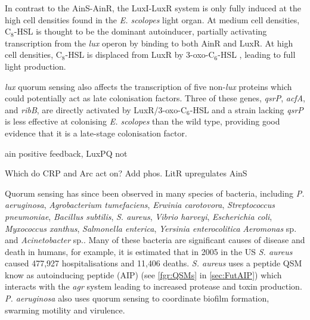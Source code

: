 In contrast to the AinS-AinR, the LuxI-LuxR system is only fully induced at the high cell densities found in the \textit{E. scolopes} light organ. At medium cell densities, C$_8$-HSL  is thought to be the dominant autoinducer, partially activating transcription from the \textit{lux} operon by binding to both AinR and LuxR\cite{Lupp2003}. At high cell densities, C$_8$-HSL  is displaced from LuxR by 3-oxo-C$_6$-HSL , leading to full light production.

\textit{lux} quorum sensing also affects the transcription of five non-\textit{lux} proteins which could potentially act as late colonisation factors\cite{Callahan2000,Qin2007}. Three of these genes, \textit{qsrP}, \textit{acfA}, and \textit{ribB}, are directly activated by LuxR/3-oxo-C$_6$-HSL\cite{Qin2007} and a strain lacking \textit{qsrP} is less effective at colonising \textit{E. scolopes} than the wild type, providing good evidence that it is a late-stage colonisation factor\cite{Callahan2000}.



ain positive feedback, LuxPQ not\cite{Lupp2004}

Which do CRP and Arc act on?
Add phos.
LitR upregulates AinS\cite{Lupp2004}





Quorum sensing has since been observed in many species of bacteria, including \textit{P. aeruginosa}, \textit{Agrobacterium tumefaciens}, \textit{Erwinia carotovora}, \textit{Streptococcus pneumoniae}, \textit{Bacillus subtilis}, \textit{S. aureus}, \textit{Vibrio harveyi}, \textit{Escherichia coli}, \textit{Myxococcus xanthus}, \textit{Salmonella enterica}, \textit{Yersinia enterocolitica}  \textit{Aeromonas} sp. and \textit{Acinetobacter} sp.\cite{Miller2001,Fuqua1994,Waters2005,Atkinson2006,Chan2011,Sauer2002,Michael2001,Ahmer2004,Nealson1970}. 
Many of these bacteria are significant causes of disease and death in humans, for example, it is estimated that in 2005 in the US \textit{S. aureus} caused 477,927 hospitalisations and 11,406 deaths\cite{Klein2007}. \textit{S. aureus} uses a peptide QSM know as autoinducing peptide (AIP) (see \ref{fgr:QSMs} in \ref{sec:FutAIP}) which interacts with the \textit{agr} system leading to increased protease and toxin production\cite{Antunes2010}. \textit{P. aeruginosa} also uses quorum sensing to coordinate biofilm formation, swarming motility and virulence.







